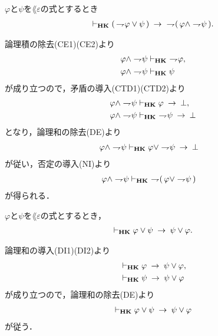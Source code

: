 	\begin{screen}
		\begin{thm}
		\label{classic:De_Morgan_law_1}
			$\varphi$と$\psi$を$\lang{\varepsilon}$の式とするとき
			\begin{align}
				\vdash_{{\scriptsize \mbox{{\bf HK}}}} (\, \rightharpoondown\hspace{-0.25em} \varphi \vee \psi\, ) 
				\hspace{0.25em}\rightarrow\hspace{0.25em}\ \rightharpoondown\hspace{-0.25em} (\, \varphi \wedge \rightharpoondown\hspace{-0.25em} \psi\, ).
			\end{align}
		\end{thm}
	\end{screen}
	
	\begin{sketch}
		論理積の除去(CE1)(CE2)より
		\begin{align}
			\varphi \wedge \rightharpoondown\hspace{-0.25em} \psi &\vdash_{{\scriptsize \mbox{{\bf HK}}}}\ \rightharpoondown\hspace{-0.25em} \varphi, \\
			\varphi \wedge \rightharpoondown\hspace{-0.25em} \psi &\vdash_{{\scriptsize \mbox{{\bf HK}}}} \psi
		\end{align}
		が成り立つので，矛盾の導入(CTD1)(CTD2)より
		\begin{align}
			\varphi \wedge \negation \psi &\provable{\mbox{{\bf HK}}}
			\varphi \rarrow \bot, \\
			\varphi \wedge \negation \psi &\provable{\mbox{{\bf HK}}}\ 
			\negation \psi \rarrow \bot
		\end{align}
		となり，論理和の除去(DE)より
		\begin{align}
			\varphi \wedge \rightharpoondown\hspace{-0.25em} \psi &\vdash_{{\scriptsize \mbox{{\bf HK}}}}
			\varphi \vee \rightharpoondown\hspace{-0.25em} \psi \hspace{0.25em}\rightarrow\hspace{0.25em} \bot
		\end{align}
		が従い，否定の導入(NI)より
		\begin{align}
			\varphi \wedge \negation \psi &\provable{\mbox{{\bf HK}}}\ 
			\negation (\, \varphi \vee \negation \psi\, )
		\end{align}
		が得られる．
		\QED
	\end{sketch}
	
	\begin{screen}
		\begin{thm}[論理和の対称律]
		\label{classic:symmetry_of_disjunction}
			$\varphi$と$\psi$を$\lang{\varepsilon}$の式とするとき，
			\begin{align}
				\vdash_{{\scriptsize \mbox{{\bf HK}}}} 
				\varphi \vee \psi \hspace{0.25em}\rightarrow\hspace{0.25em} \psi \vee \varphi.
			\end{align}
		\end{thm}
	\end{screen}
	
	\begin{sketch}
		論理和の導入(DI1)(DI2)より
		\begin{align}
			&\vdash_{{\scriptsize \mbox{{\bf HK}}}} \varphi \hspace{0.25em}\rightarrow\hspace{0.25em} \psi \vee \varphi, \\
			&\vdash_{{\scriptsize \mbox{{\bf HK}}}} \psi \hspace{0.25em}\rightarrow\hspace{0.25em} \psi \vee \varphi
		\end{align}
		が成り立つので，論理和の除去(DE)より
		\begin{align}
			\vdash_{{\scriptsize \mbox{{\bf HK}}}} \varphi \vee \psi \hspace{0.25em}\rightarrow\hspace{0.25em} \psi \vee \varphi
		\end{align}
		が従う．
		\QED
	\end{sketch}
	
